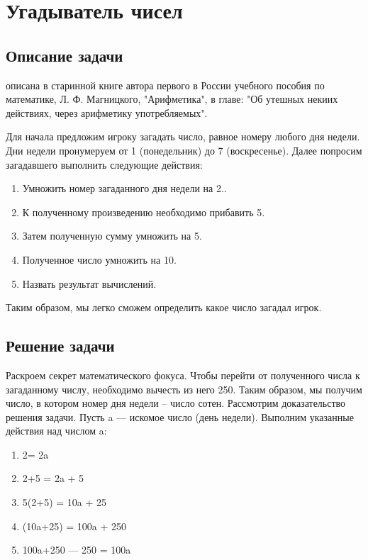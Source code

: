 \chapter{Угадыватель чисел}
\label{ch:guessnumbers}

\section{Описание задачи}

 описана в старинной книге автора первого в России учебного пособия по математике, Л. Ф. Магницкого, "Арифметика", в главе: "Об утешных некиих действиях, через арифметику употребляемых".

Для начала предложим игроку загадать число, равное номеру любого дня недели. Дни недели пронумеруем от 1 (понедельник) до 7 (воскресенье). Далее попросим загадавшего выполнить следующие действия:

\begin{enumerate}
\item Умножить номер загаданного дня недели на 2..
\item К полученному произведению необходимо прибавить 5.
\item Затем полученную сумму умножить на 5.
\item Полученное число умножить на 10.
\item Назвать результат вычислений.
\end{enumerate}

Таким образом, мы легко сможем определить какое число загадал игрок.

\section{Решение задачи}
Раскроем секрет математического фокуса.
Чтобы перейти от полученного числа к загаданному числу, необходимо вычесть из него 250. Таким образом, мы получим число, в котором номер дня недели – число сотен. Рассмотрим доказательство решения задачи. Пусть {a} — искомое число (день недели). Выполним указанные действия над числом {a}:
\begin{enumerate}
   \item 2\cdota = 2a

   \item 2\cdota+5 = 2a + 5

   \item 5\cdot(2\cdota+5) = 10a + 25
 
   \item (10a+25) = 100a + 250
 
   \item 100a+250 — 250 = 100a
\end{enumerate}

